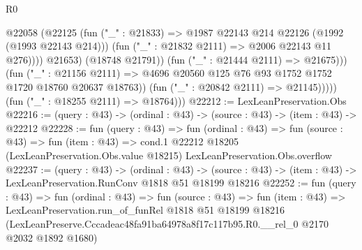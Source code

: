 \begin{lexlean}{R0}
\begin{coremodule}
                            @22058
                              (@22125
                                (fun ("_" : @21833) =>
                                @1987 @22143 @214 @22126 (@1992 (@1993 @22143 @214)))
                                (fun ("_" : @21832 @2111) => @2006 @22143 @11 @276))))
                          @21653)
                        (@18748 @21791))
                      (fun ("_" : @21444 @2111) => @21675)))
                  (fun ("_" : @21156 @2111) =>
                  @4696 @20560 @125 @76 @93 @1752 @1752 @1720 @18760 @20637 @18763))
                (fun ("_" : @20842 @2111) => @21145)))))
        (fun ("_" : @18255 @2111) => @18764)))
@22212 := LexLeanPreservation.Obs
@22216 := (query : @43) -> (ordinal : @43) -> (source : @43) -> (item : @43) -> @22212
@22228 := fun (query : @43) =>
  fun (ordinal : @43) =>
  fun (source : @43) =>
  fun (item : @43) =>
  cond.{1} @22212 @18205 (LexLeanPreservation.Obs.value @18215) LexLeanPreservation.Obs.overflow
@22237 := (query : @43) ->
  (ordinal : @43) ->
  (source : @43) -> (item : @43) -> LexLeanPreservation.RunConv @1818 @51 @18199 @18216
@22252 := fun (query : @43) =>
  fun (ordinal : @43) =>
  fun (source : @43) =>
  fun (item : @43) =>
  LexLeanPreservation.run_of_funRel
    @1818
    @51
    @18199
    @18216
    (LexLeanPreserve.Cccadeac48fa91ba64978a8f17c117b95.R0.__rel_0 @2170 @2032 @1892 @1680)
\end{coremodule}
\end{lexlean}

